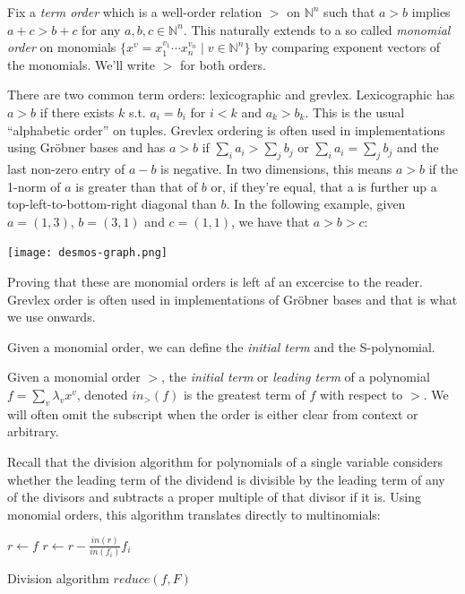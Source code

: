 \documentclass{article}
\theoremstyle{changedot}
\theoremstyle{changedotbreak}
\theoremstyle{nonumberplain}
\DeclarePairedDelimiter{\tuple}{\langle}{\rangle}
\begin{document}
Fix a \emph{term order} which is a well-order relation $>$ on $\mathbb N^{n}$ such that $a > b$ implies $a + c > b + c$ for any $a, b, c \in \mathbb N^{n}$. This naturally extends to a so called \emph{monomial order} on monomials $\{x^{v} = x_{1}^{v_{1}} \cdots x_{n}^{v_{n}} \mid v \in \mathbb N^{n}\}$ by comparing exponent vectors of the monomials. We'll write $>$ for both orders.

There are two common term orders: lexicographic and grevlex. Lexicographic has $a > b$ if there exists $k$ s.t. $a_{i} = b_{i}$ for $i < k$ and $a_{k} > b_{k}$. This is the usual ``alphabetic order'' on tuples. Grevlex ordering is often used in implementations using Gröbner bases and has $a > b$ if $\sum_{i} a_{i} > \sum_{j} b_{j}$ or   $\sum_{i} a_{i} = \sum_{j} b_{j}$ and the last non-zero entry of $a - b$ is negative. In two dimensions, this means $a > b$ if the 1-norm of $a$ is greater than that of $b$ or, if they're equal, that a is further up a top-left-to-bottom-right diagonal than $b$. In the following example, given $a=(1, 3)$, $b=(3, 1)$ and $c=(1, 1)$, we have that $a > b > c$:

\begin{center}
  \texttt{[image: desmos-graph.png]}
\end{center}

Proving that these are monomial orders is left af an excercise to the reader. Grevlex order is often used in implementations of Gröbner bases and that is what we use onwards.

Given a monomial order, we can define the \emph{initial term} and the S-polynomial.

\begin{definition}
  Given a monomial order $>$, the \emph{initial term} or \emph{leading term} of a polynomial $f = \sum_{v} \lambda_{v} x^{v}$, denoted $in_{>}(f)$ is the greatest term of $f$ with respect to $>$. We will often omit the subscript when the order is either clear from context or arbitrary.
\end{definition}

Recall that the division algorithm for polynomials of a single variable considers whether the leading term of the dividend is divisible by the leading term of any of the divisors and subtracts a proper multiple of that divisor if it is. Using monomial orders, this algorithm translates directly to multinomials:

\begin{algorithm}[H]
\DontPrintSemicolon

  $r \leftarrow f$\;
    {
        $r \leftarrow r - \frac{in(r)}{in(f_{i})} f_{i}$
    }

    \caption{Division algorithm $reduce(f, F)$}
    \label{alg:div}
\end{algorithm}
\end{document}
